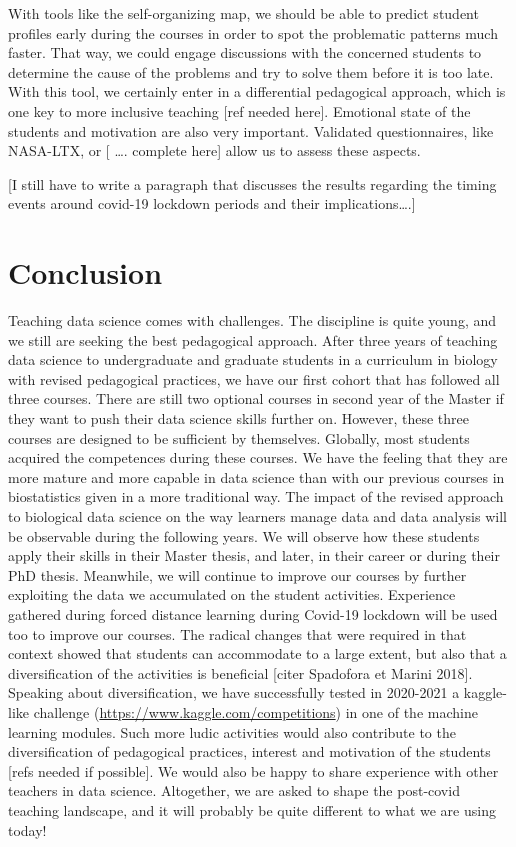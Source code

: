\documentclass[
]{article}
\begin{document}
With tools like the self-organizing map, we should be able to predict
student profiles early during the courses in order to spot the
problematic patterns much faster. That way, we could engage discussions
with the concerned students to determine the cause of the problems and
try to solve them before it is too late. With this tool, we certainly
enter in a differential pedagogical approach, which is one key to more
inclusive teaching {[}ref needed here{]}. Emotional state of the
students and motivation are also very important. Validated
questionnaires, like NASA-LTX, or {[} \ldots. complete here{]} allow us
to assess these aspects.

{[}I still have to write a paragraph that discusses the results
regarding the timing events around covid-19 lockdown periods and their
implications\ldots.{]}

\hypertarget{conclusion}{%
\section{Conclusion}\label{conclusion}}

Teaching data science comes with challenges. The discipline is quite
young, and we still are seeking the best pedagogical approach. After
three years of teaching data science to undergraduate and graduate
students in a curriculum in biology with revised pedagogical practices,
we have our first cohort that has followed all three courses. There are
still two optional courses in second year of the Master if they want to
push their data science skills further on. However, these three courses
are designed to be sufficient by themselves. Globally, most students
acquired the competences during these courses. We have the feeling that
they are more mature and more capable in data science than with our
previous courses in biostatistics given in a more traditional way. The
impact of the revised approach to biological data science on the way
learners manage data and data analysis will be observable during the
following years. We will observe how these students apply their skills
in their Master thesis, and later, in their career or during their PhD
thesis. Meanwhile, we will continue to improve our courses by further
exploiting the data we accumulated on the student activities. Experience
gathered during forced distance learning during Covid-19 lockdown will
be used too to improve our courses. The radical changes that were
required in that context showed that students can accommodate to a large
extent, but also that a diversification of the activities is beneficial
{[}citer Spadofora et Marini 2018{]}. Speaking about diversification, we
have successfully tested in 2020-2021 a kaggle-like challenge
(\url{https://www.kaggle.com/competitions}) in one of the machine
learning modules. Such more ludic activities would also contribute to
the diversification of pedagogical practices, interest and motivation of
the students {[}refs needed if possible{]}. We would also be happy to
share experience with other teachers in data science. Altogether, we are
asked to shape the post-covid teaching landscape, and it will probably
be quite different to what we are using today!
\end{document}
